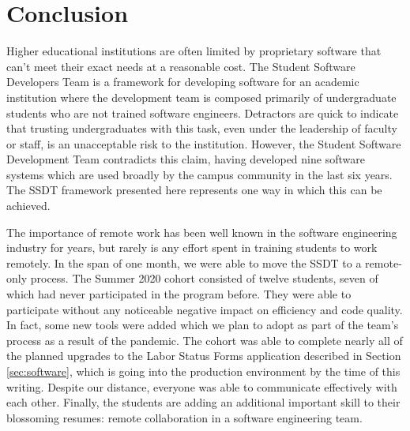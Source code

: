 \section{Conclusion}

Higher educational institutions are often limited by proprietary software that can't meet their exact needs at a reasonable cost. The Student Software Developers Team is a framework for developing software for an academic institution where the development team is composed primarily of undergraduate students who are not trained software engineers. Detractors are quick to indicate that trusting undergraduates with this task, even under the leadership of faculty or staff, is an unacceptable risk to the institution. However, the Student Software Development Team contradicts this claim, having developed nine software systems which are used broadly by the campus community in the last six years. The SSDT framework presented here represents one way in which this can be achieved.

The importance of remote work has been well known in the software engineering industry for years, but rarely is any effort spent in training students to work remotely. In the span of one month, we were able to move the SSDT to a remote-only process. The Summer 2020 cohort consisted of twelve students, seven of which had never participated in the program before. They were able to participate without any noticeable negative impact on efficiency and code quality. In fact, some new tools were added which we plan to adopt as part of the team's process as a result of the pandemic. The cohort was able to complete nearly all of the planned upgrades to the Labor Status Forms application described in Section \ref{sec:software}, which is going into the production environment by the time of this writing. Despite our distance, everyone was able to communicate effectively with each other. Finally, the students are adding an additional important skill to their blossoming resumes: remote collaboration in a software engineering team.
